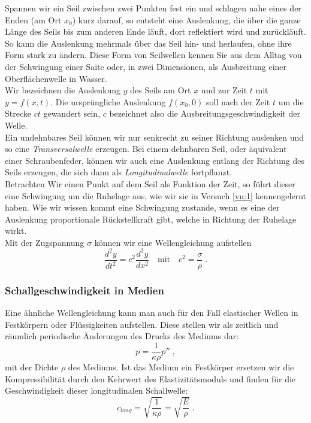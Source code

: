 Spannen wir ein Seil zwischen zwei Punkten fest ein und schlagen nahe eines der Enden (am Ort $x_0$) kurz darauf, so entsteht eine Auslenkung, die über die ganze Länge des Seils bis zum anderen Ende läuft, dort reflektiert wird und zurückläuft. So kann die Auslenkung mehrmals über das Seil hin- und herlaufen, ohne ihre Form stark zu ändern. Diese Form von Seilwellen kennen Sie aus dem Alltag von der Schwingung einer Saite oder, in zwei Dimensionen, als Ausbreitung einer Oberflächenwelle in Wasser.\\
Wir bezeichnen die Auslenkung $y$ des Seils am Ort $x$ und zur Zeit $t$ mit $y=f(x,t)$. Die ursprüngliche Auslenkung $f(x_0, 0)$ soll nach der Zeit $t$ um die Strecke $ct$ gewandert sein, $c$ bezeichnet also die Ausbreitungsgeschwindigkeit der Welle.\\
Ein undehnbares Seil können wir nur senkrecht zu seiner Richtung auslenken und so eine \textit{Transversalwelle} erzeugen. Bei einem dehnbaren Seil, oder äquivalent einer Schraubenfeder, können wir auch eine Auslenkung entlang der Richtung des Seils erzeugen, die sich dann als \textit{Longitudinalwelle} fortpflanzt.\\

\noindent
Betrachten Wir einen Punkt auf dem Seil als Funktion der Zeit, so führt dieser eine Schwingung um die Ruhelage aus, wie wir sie in Versuch \ref{vn:1} kennengelernt haben. Wie wir wissen kommt eine Schwingung zustande, wenn es eine der Auslenkung proportionale Rückstellkraft gibt, welche in Richtung der Ruhelage wirkt.\\
Mit der Zugspannung $\sigma$ können wir eine Wellengleichung aufstellen
\begin{equation*}
	\frac{d^2 y}{dt^2} = c^2\frac{d^2 y}{dx^2}\quad \mathrm{mit}\quad c^2 = \frac{\sigma}{\rho}\; .
\end{equation*}

\subsubsection{Schallgeschwindigkeit in Medien}

Eine ähnliche Wellengleichung kann man auch für den Fall elastischer Wellen in Festkörpern oder Flüssigkeiten aufstellen. Diese stellen wir als zeitlich und räumlich periodische Änderungen des Drucks des Mediums dar:
\begin{equation*}
	\ddot{p} = \frac{1}{\kappa\rho} p''\; ,
\end{equation*}
mit der Dichte $\rho$ des Mediums. Ist das Medium ein Festkörper ersetzen wir die Kompressibilität durch den Kehrwert des Elastizitätsmoduls und finden für die Geschwindigkeit dieser longitudinalen Schallwelle:
\begin{equation}
	c_{long} = \sqrt{\frac{1}{\kappa\rho}} = \sqrt{\frac{E}{\rho}}\; .
\end{equation}

